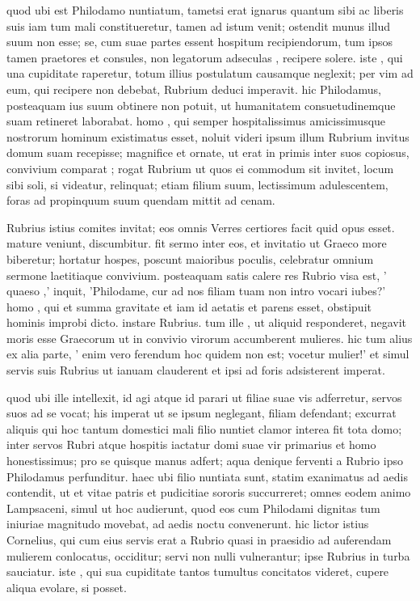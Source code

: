  quod ubi est Philodamo nuntiatum, tametsi erat ignarus quantum sibi ac liberis suis iam tum mali constitueretur, tamen ad istum venit; ostendit munus illud suum non esse; se, cum suae partes essent hospitum recipiendorum, tum ipsos tamen praetores et consules, non legatorum adseculas , recipere solere. iste , qui una cupiditate raperetur, totum illius postulatum causamque neglexit; per vim ad eum, qui recipere non debebat, Rubrium deduci imperavit. hic Philodamus, posteaquam ius suum obtinere non potuit, ut humanitatem consuetudinemque suam retineret laborabat. homo , qui semper hospitalissimus amicissimusque nostrorum hominum existimatus esset, noluit videri ipsum illum Rubrium invitus domum suam recepisse; magnifice et ornate, ut erat in primis inter suos copiosus, convivium comparat ; rogat Rubrium ut quos ei commodum sit invitet, locum sibi soli, si videatur, relinquat; etiam filium suum, lectissimum adulescentem, foras ad propinquum suum quendam mittit ad cenam.

 Rubrius istius comites invitat; eos omnis Verres certiores facit quid opus esset. mature veniunt, discumbitur. fit sermo inter eos, et invitatio ut Graeco more biberetur; hortatur hospes, poscunt maioribus poculis, celebratur omnium sermone laetitiaque convivium. posteaquam satis calere res Rubrio visa est, ' quaeso ,' inquit, 'Philodame, cur ad nos filiam tuam non intro vocari iubes?' homo , qui et summa gravitate et iam id aetatis et parens esset, obstipuit hominis improbi dicto. instare Rubrius. tum ille , ut aliquid responderet, negavit moris esse Graecorum ut in convivio virorum accumberent mulieres. hic tum alius ex alia parte, ' enim vero ferendum hoc quidem non est; vocetur mulier!' et simul servis suis Rubrius ut ianuam clauderent et ipsi ad foris adsisterent imperat.

 quod ubi ille intellexit, id agi atque id parari ut filiae suae vis adferretur, servos suos ad se vocat; his imperat ut se ipsum neglegant, filiam defendant; excurrat aliquis qui hoc tantum domestici mali filio nuntiet clamor interea fit tota domo; inter servos Rubri atque hospitis iactatur domi suae vir primarius et homo honestissimus; pro se quisque manus adfert; aqua denique ferventi a Rubrio ipso Philodamus perfunditur. haec ubi filio nuntiata sunt, statim exanimatus ad aedis contendit, ut et vitae patris et pudicitiae sororis succurreret; omnes eodem animo Lampsaceni, simul ut hoc audierunt, quod eos cum Philodami dignitas tum iniuriae magnitudo movebat, ad aedis noctu convenerunt. hic lictor istius Cornelius, qui cum eius servis erat a Rubrio quasi in praesidio ad auferendam mulierem conlocatus, occiditur; servi non nulli vulnerantur; ipse Rubrius in turba sauciatur. iste , qui sua cupiditate tantos tumultus concitatos videret, cupere aliqua evolare, si posset.

